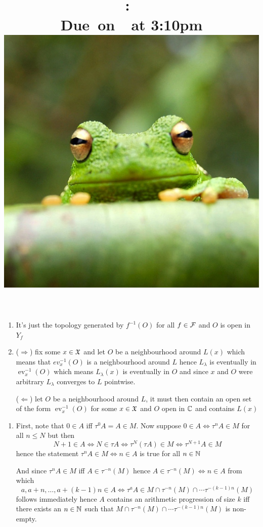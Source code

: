 \documentclass{article}
\title{
    \vspace{2in}
    \textmd{\textbf{\hmwkClass:\ \hmwkTitle}}\\
    \normalsize\vspace{0.1in}\small{Due\ on\ \hmwkDueDate\ at 3:10pm}\\
    \includegraphics[scale=0.2]{frog} \\
    \vspace{0.1in}\large{\textit{\hmwkClassTime}}
    \vspace{3in}
}
\author{\hmwkAuthorName}
\date{}
\newcommand{\ev}{\operatorname{ev}}
\begin{document}
\maketitle

\pagebreak
\begin{homeworkProblem}
    \begin{enumerate}
        \item It's just the topology generated by $f^{-1}(O)$ for all $f\in\mathcal{F}$ and $O$ is open in $Y_f$
        \item ($\Rightarrow$) fix some $x\in\mathfrak{X}$ and let $O$ be a neighbourhood around $L(x)$ which means that $ev_x^{-1}(O)$ is a neighbourhood around $L$ hence $L_\lambda$ is eventually in $\ev_x^{-1}(O)$ which means $L_\lambda(x)$ is eventually in $O$ and since $x$ and $O$ were arbitrary $L_\lambda$ converges to $L$ pointwise.
        
        ($\Leftarrow$) let $O$ be a neighbourhood around $L$, it must then contain an open set of the form $\ev_x^{-1}(O)$ for some $x\in\mathfrak{X}$ and $O$ open in $\mathbb{C}$ and contains $L(x)$
    \end{enumerate}
\end{homeworkProblem}
\begin{homeworkProblem}
    \begin{enumerate}
        \item First, note that $0\in A$ iff  $\tau^0A=A\in M$. Now suppose $0\in A\iff\tau^nA\in M$ for all $n\leq N$ but then
        \[N+1\in A\iff N\in \tau A \iff \tau^N(\tau A)\in M \iff \tau^{N+1}A\in M\]
        hence the statement $\tau^nA\in M\iff n\in A$ is true for all $n\in\mathbb{N}$

        And since $\tau^nA\in M$ iff $A\in\tau^{-n}(M)$ hence $A\in \tau^{-n}(M)\iff n\in A$ from which
        \[a,a+n,\dots,a+(k-1)n\in A \iff \tau^aA\in M\cap\tau^{-n}(M)\cap\cdots\tau^{-(k-1)n}(M)\]
        follows immediately hence $A$ contains an arithmetic progression of size $k$ iff there exists an $n\in\mathbb{N}$ such that $M\cap\tau^{-n}(M)\cap\cdots\tau^{-(k-1)n}(M)$ is non-empty.
    \end{enumerate}
\end{homeworkProblem}
\end{document}
